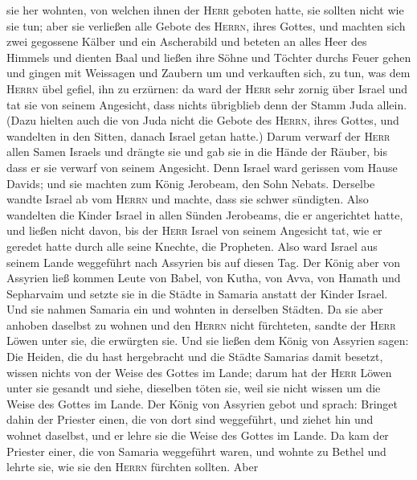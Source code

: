 sie her wohnten, von welchen ihnen der \textsc{Herr} geboten hatte, sie
sollten nicht wie sie tun;  aber sie verließen alle
Gebote des \textsc{Herrn}, ihres Gottes, und machten sich zwei gegossene
Kälber und ein Ascherabild und beteten an alles Heer des Himmels und
dienten Baal  und ließen ihre Söhne und Töchter durchs
Feuer gehen und gingen mit Weissagen und Zaubern um und verkauften sich,
zu tun, was dem \textsc{Herrn} übel gefiel, ihn zu erzürnen:
 da ward der \textsc{Herr} sehr zornig über Israel und
tat sie von seinem Angesicht, dass nichts übrigblieb denn der Stamm Juda
allein.  (Dazu hielten auch die von Juda nicht die Gebote
des \textsc{Herrn}, ihres Gottes, und wandelten in den Sitten, danach
Israel getan hatte.)  Darum verwarf der \textsc{Herr}
allen Samen Israels und drängte sie und gab sie in die Hände der Räuber,
bis dass er sie verwarf von seinem Angesicht.  Denn
Israel ward gerissen vom Hause Davids; und sie machten zum König
Jerobeam, den Sohn Nebats. Derselbe wandte Israel ab vom \textsc{Herrn}
und machte, dass sie schwer sündigten.  Also wandelten
die Kinder Israel in allen Sünden Jerobeams, die er angerichtet hatte,
und ließen nicht davon,  bis der \textsc{Herr} Israel von
seinem Angesicht tat, wie er geredet hatte durch alle seine Knechte, die
Propheten. Also ward Israel aus seinem Lande weggeführt nach Assyrien
bis auf diesen Tag.  Der König aber von Assyrien ließ
kommen Leute von Babel, von Kutha, von Avva, von Hamath und Sepharvaim
und setzte sie in die Städte in Samaria anstatt der Kinder Israel. Und
sie nahmen Samaria ein und wohnten in derselben Städten. 
Da sie aber anhoben daselbst zu wohnen und den \textsc{Herrn} nicht
fürchteten, sandte der \textsc{Herr} Löwen unter sie, die erwürgten sie.
 Und sie ließen dem König von Assyrien sagen: Die Heiden,
die du hast hergebracht und die Städte Samarias damit besetzt, wissen
nichts von der Weise des Gottes im Lande; darum hat der \textsc{Herr}
Löwen unter sie gesandt und siehe, dieselben töten sie, weil sie nicht
wissen um die Weise des Gottes im Lande.  Der König von
Assyrien gebot und sprach: Bringet dahin der Priester einen, die von
dort sind weggeführt, und ziehet hin und wohnet daselbst, und er lehre
sie die Weise des Gottes im Lande.  Da kam der Priester
einer, die von Samaria weggeführt waren, und wohnte zu Bethel und lehrte
sie, wie sie den \textsc{Herrn} fürchten sollten.  Aber
